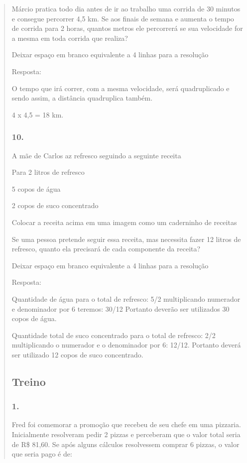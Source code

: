 \begin{enumerate}
\begin{escolha}
\begin{enumerate}
\begin{itemize}
\begin{itemize}
\begin{escolha}
\begin{quote}
\begin{escolha}
{Márcio pratica todo dia antes de ir ao trabalho uma corrida de 30
minutos e consegue percorrer 4,5 km. Se aos finais de semana e aumenta o
tempo de corrida para 2 horas, quantos metros ele percorrerá se sua
velocidade for a mesma em toda corrida que realiza?

Deixar espaço em branco equivalente a 4 linhas para a resolução

Resposta:

O tempo que irá correr, com a mesma velocidade, será quadruplicado e
sendo assim, a distância quadruplica também.

4 x 4,5 = 18 km.

\subsubsection{10.}\label{section-126}

A mãe de Carlos az refresco seguindo a seguinte receita

Para 2 litros de refresco

5 copos de água

2 copos de suco concentrado

Colocar a receita acima em uma imagem como um caderninho de receitas

Se uma pessoa pretende seguir essa receita, mas necessita fazer 12
litros de refresco, quanto ela precisará de cada componente da receita?

Deixar espaço em branco equivalente a 4 linhas para a resolução

Resposta:

Quantidade de água para o total de refresco: 5/2 multiplicando numerador
e denominador por 6 teremos: 30/12 Portanto deverão ser utilizados 30
copos de água.

Quantidade total de suco concentrado para o total de refresco: 2/2
multiplicando o numerador e o denominador por 6: 12/12. Portanto deverá
ser utilizado 12 copos de suco concentrado.

\subsection{Treino}\label{treino-9}

\subsubsection{1.}\label{section-127}

Fred foi comemorar a promoção que recebeu de seu chefe em uma pizzaria.
Inicialmente resolveram pedir 2 pizzas e perceberam que o valor total
seria de R\$ 81,60. Se após alguns cálculos resolvessem comprar 6
pizzas, o valor que seria pago é de:

}
\end{escolha}
\end{quote}
\end{escolha}
\end{itemize}
\end{itemize}
\end{enumerate}
\end{escolha}
\end{enumerate}
